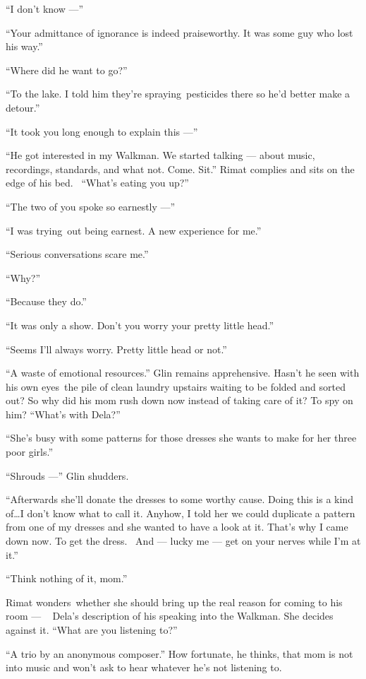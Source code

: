 \documentclass[twoside,11pt]{book}
\begin{document}
``I don't know ---''

``Your admittance of ignorance is indeed praiseworthy. It was some guy who lost his way.''

``Where did he want to go?''

``To the lake. I told him they're spraying~pesticides there so he'd better make a detour.''

``It took you long enough to explain this ---''

``He got interested in my Walkman. We started talking --- about music, recordings, standards, and what not.
Come. Sit.'' Rimat complies and sits on the edge of his bed.~ ``What's eating you
up?''

``The two of you spoke so earnestly ---''

``I was trying~out being earnest. A new experience for me.''

``Serious conversations scare me.''

``Why?''

``Because they do.''

``It was only a show. Don't you worry your pretty little  head.''

``Seems I'll always worry. Pretty little head or not.''

``A waste of emotional resources.'' Glin remains apprehensive. Hasn't he seen with his own
eyes~the pile of clean laundry upstairs waiting to be folded and sorted out? So why did his mom rush down now instead
of taking care of it? To spy on him? ``What's with Dela?''

``She's busy with some patterns for those dresses she wants to make for her three poor
girls.''

``Shrouds ---'' Glin shudders.

``Afterwards she'll donate the dresses to some worthy cause. Doing this is a kind of{\ldots}I don't know
what to call it. Anyhow, I told her we could duplicate a pattern from one of my dresses and she wanted to have a look at
it. That's why I came down now. To get the dress. ~And --- lucky me --- get on your nerves while I'm at it.''

``Think nothing of it, mom.''

Rimat wonders~whether she should bring up the real reason for coming to his room --- ~ Dela's description of his speaking
into the Walkman. She decides against it. ``What are you listening to?''

``A trio by an anonymous composer.'' How fortunate, he thinks, that mom is not into music and
won't ask to hear whatever he's  not listening to.
\end{document}
